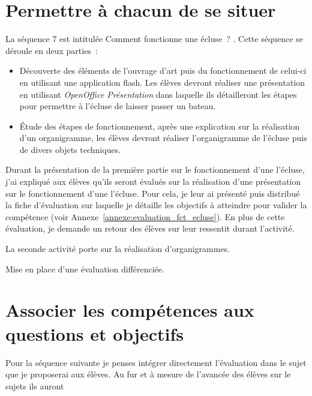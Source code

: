 \section{Permettre à chacun de se situer }

La séquence 7 est intitulée \og Comment fonctionne une écluse~? \fg{}.
Cette séquence se déroule en deux parties~:
\begin{itemize}
\item Découverte des éléments de l'ouvrage d'art puis du fonctionnement de celui-ci en utilisant une application flash. Les élèves devront réaliser une présentation en utilisant \textit{OpenOffice Présentation} dans laquelle ils détailleront les étapes pour permettre à l'écluse de laisser passer un bateau.
\item Étude des étapes de fonctionnement, après une explication sur la réalisation d'un organigramme, les élèves devront réaliser l'organigramme de l'écluse puis de divers objets techniques.
\end{itemize} 

Durant la présentation de la première partie sur le fonctionnement d'une l'écluse, j'ai expliqué aux élèves qu'ils seront évalués sur la réalisation d'une présentation sur le fonctionnement d'une l'écluse.
Pour cela, je leur ai présenté puis distribué la fiche d'évaluation sur laquelle je détaille les objectifs à atteindre pour valider la compétence (voir Annexe~\ref{annexe:evaluation_fct_ecluse}).
En plus de cette évaluation, je demande un retour des élèves sur leur ressentit durant l'activité.

La seconde activité porte sur la réalisation d'organigrammes.

Mise en place d'une évaluation différenciée.


\section{Associer les compétences aux questions et objectifs}

Pour la séquence suivante je penses intégrer directement l'évaluation dans le sujet que je proposerai aux élèves.
Au fur et à mesure de l'avancée des élèves sur le sujets ils auront 



